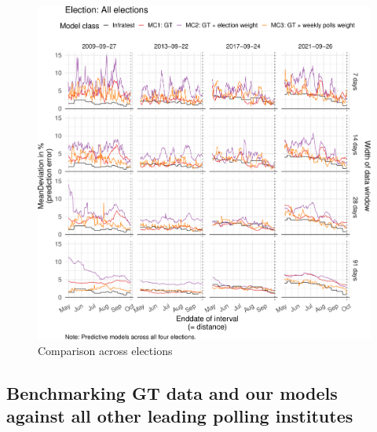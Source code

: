 \documentclass[
  letterpaper,
  DIV=11,
  numbers=noendperiod]{scrartcl}
\begin{document}
\begin{figure}[H]

\caption{\label{fig-A9}Comparison across elections}

{\centering \includegraphics{figures/fig-A9-1.pdf}

}

\end{figure}

\hypertarget{benchmarking-gt-data-and-our-models-against-all-other-leading-polling-institutes}{%
\subsection{Benchmarking GT data and our models against all other
leading polling
institutes}\label{benchmarking-gt-data-and-our-models-against-all-other-leading-polling-institutes}}
\end{document}

